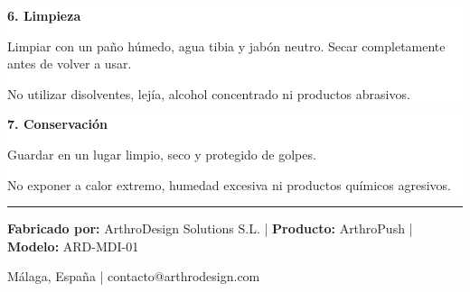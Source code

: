\documentclass[11pt,a4paper]{article}
\begin{document}
\noindent
\begin{minipage}{0.48\textwidth}
\setlength{\fboxsep}{9pt}
\colorbox{white}{
\begin{minipage}{0.92\textwidth}

{\large\bfseries\color{ArthroNavy} 6. Limpieza}

\vspace{0.2cm}

Limpiar con un paño húmedo, agua tibia y jabón neutro. Secar completamente antes de volver a usar.

\vspace{0.15cm}

No utilizar disolventes, lejía, alcohol concentrado ni productos abrasivos.

\end{minipage}
}
\end{minipage}
\hfill
\begin{minipage}{0.48\textwidth}
\setlength{\fboxsep}{9pt}
\colorbox{white}{
\begin{minipage}{0.92\textwidth}

{\large\bfseries\color{ArthroNavy} 7. Conservación}

\vspace{0.2cm}

Guardar en un lugar limpio, seco y protegido de golpes.

\vspace{0.15cm}

No exponer a calor extremo, humedad excesiva ni productos químicos agresivos.

\end{minipage}
}
\end{minipage}

\vspace{0.5cm}

\begin{center}
\color{ArthroTeal}\rule{0.9\textwidth}{1pt}

\vspace{0.15cm}

{\small\textbf{Fabricado por:} ArthroDesign Solutions S.L. \quad | \quad \textbf{Producto:} ArthroPush \quad | \quad \textbf{Modelo:} ARD-MDI-01}

\vspace{0.1cm}

{\small Málaga, España \quad | \quad contacto@arthrodesign.com}
\end{center}
\end{document}
